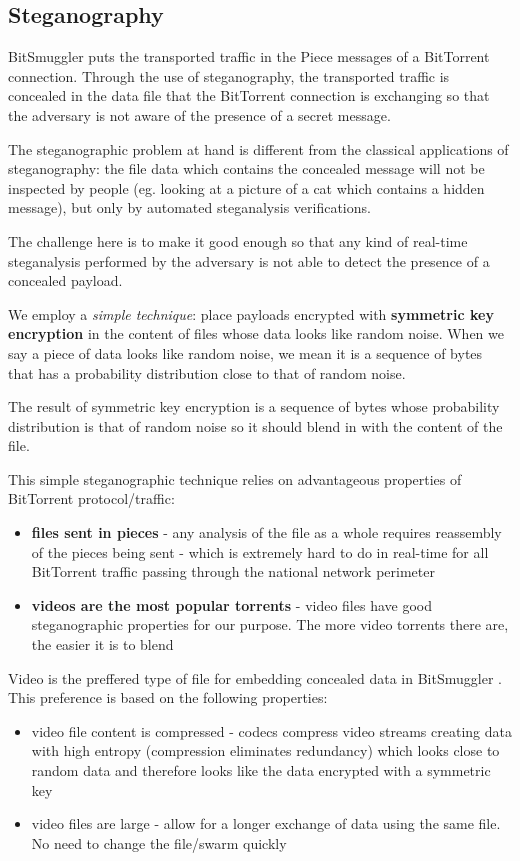 \documentclass[11pt]{article} %
\newcommand{\projectName}{BitSmuggler }
\begin{document}
\subsection{Steganography}

\projectName puts the transported traffic in the Piece messages of a BitTorrent connection. Through the use of steganography, the transported traffic is concealed in the data file that the BitTorrent connection is exchanging so that the adversary is not aware of the presence of a secret message.

The steganographic problem at hand is different from the classical applications of steganography: the file data which contains the concealed message will not be inspected by people (eg. looking at a picture of a cat which contains a hidden message), but only by automated steganalysis verifications.

The challenge here is to make it good enough so that any kind of real-time steganalysis performed by the adversary is not able to detect the presence of a concealed payload.

We employ a \textit{simple technique}: place payloads encrypted with \textbf{symmetric key encryption} in the content of files whose data looks like random noise. When we say a piece of data looks like random noise, we mean it is a sequence of bytes that has a probability distribution close to that of random noise.

The result of symmetric key encryption is a sequence of bytes whose probability distribution is that of random noise so it should blend in with the content of the file.

This simple steganographic technique relies on advantageous properties of BitTorrent protocol/traffic:
\begin{itemize}
\item \textbf{files sent in pieces} - any analysis of the file as a whole requires reassembly of the pieces being sent - which is extremely hard to do in real-time for all BitTorrent traffic passing through the national network perimeter
\item \textbf{videos are the most popular torrents} - video files have good steganographic properties for our purpose. The more video torrents there are, the easier it is to blend
\end{itemize}


Video is the preffered type of file for embedding concealed data in \projectName. This preference is based on the following properties:
\begin{itemize}
\item video file content is compressed - codecs compress video streams creating data with high entropy (compression eliminates redundancy) which looks close to random data and therefore looks like the data encrypted with a symmetric key
\item video files are large - allow for a longer exchange of data using the same file. No need to change the file/swarm quickly

\end{itemize}
\end{document}
